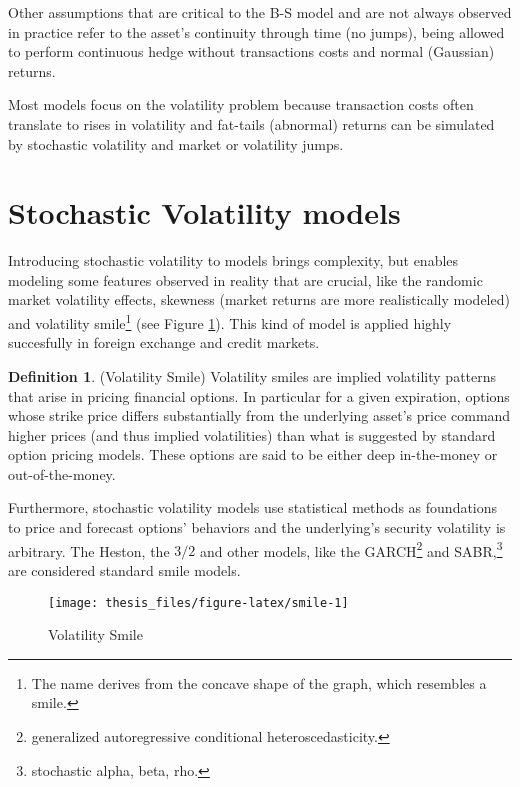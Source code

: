 \documentclass[12pt,twoside]{reedthesis}
\theoremstyle{definition}
\newtheorem{definition}{Definition}[section]
\theoremstyle{definition}
\theoremstyle{remark}
\begin{document}
  Other assumptions that are critical to the B-S model and are not always
  observed in practice refer to the asset's continuity through time (no
  jumps), being allowed to perform continuous hedge without transactions
  costs and normal (Gaussian) returns.
  
  Most models focus on the volatility problem because transaction costs
  often translate to rises in volatility and fat-tails (abnormal) returns
  can be simulated by stochastic volatility and market or volatility
  jumps.
  
  \section{Stochastic Volatility
  models}\label{stochastic-volatility-models}
  
  Introducing stochastic volatility to models brings complexity, but
  enables modeling some features observed in reality that are crucial,
  like the randomic market volatility effects, skewness (market returns
  are more realistically modeled) and volatility smile\footnote{The name
    derives from the concave shape of the graph, which resembles a smile.}
  (see Figure \ref{fig:smile}). This kind of model is applied highly
  succesfully in foreign exchange and credit markets.
  \begin{definition}{(Volatility Smile)} 
  Volatility smiles are implied volatility patterns that arise in pricing financial options. In particular for a given expiration, options whose strike price differs substantially from the underlying asset's price command higher prices (and thus implied volatilities) than what is suggested by standard option pricing models. These options are said to be either deep in-the-money or out-of-the-money.
  \end{definition}
  Furthermore, stochastic volatility models use statistical methods as
  foundations to price and forecast options' behaviors and the
  underlying's security volatility is arbitrary. The Heston, the \(3/2\)
  and other models, like the GARCH\footnote{generalized autoregressive
    conditional heteroscedasticity.} and SABR,\footnote{stochastic alpha,
    beta, rho.} are considered standard smile models.
  \begin{figure}
  
  {\centering \texttt{[image: thesis\_files/figure-latex/smile-1]} 
  
  }
  
  \caption{Volatility Smile \label{smile}}\label{fig:smile}
  \end{figure}
\end{document}
